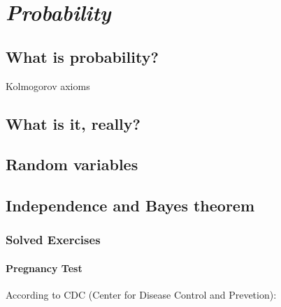 \documentclass{book}
\begin{document}
\chapter{\emph{Probability}}

\label{probability}

\section{What is probability?}
Kolmogorov axioms

\section{What is it, really?}

\section{Random variables}

\section{Independence and Bayes theorem}

\subsection{Solved Exercises}



\subsubsection{Pregnancy Test}

    According to CDC (Center for Disease Control and Prevetion):
    
\end{document}
